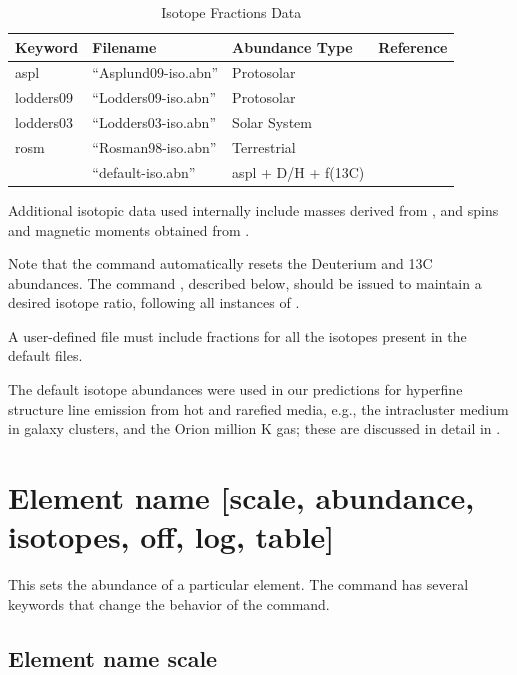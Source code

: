 \begin{table}
\centering
\caption{Isotope Fractions Data}
\label{tab:isotopes}
\begin{tabular}{llll}
\hline
Keyword		& Filename		& Abundance Type	&	Reference		\\
\hline
aspl		& ``Asplund09-iso.abn''	& Protosolar		&	\citet{Asplund2009}	\\
lodders09	& ``Lodders09-iso.abn''	& Protosolar		&	\citet{Lodders2009}	\\
lodders03	& ``Lodders03-iso.abn''	& Solar System		&	\citet{Lodders2003}	\\
rosm		& ``Rosman98-iso.abn''	& Terrestrial 		&	\citet{Rosman1998}	\\
    		& ``default-iso.abn''	& aspl + D/H + f(13C)	&				\\
\hline
\end{tabular}
\end{table}

Additional isotopic data used internally include masses
derived from \citet{Audi1995}, and spins and magnetic
moments obtained from \citet{Stone2005}.

Note that the command automatically resets the Deuterium
and 13C abundances.
The command , described
below, should be issued to maintain a desired isotope ratio,
following all instances of .

A user-defined file must include fractions for all
the isotopes present in the default files.

\par
The default isotope abundances were used in our predictions
for hyperfine structure line emission from hot and rarefied
media, e.g., the intracluster medium in galaxy clusters, and
the Orion million K gas; these are discussed in detail in
\citet{Chatzikos2014}.

\section{Element name [scale, abundance, isotopes, off, log, table]}

This sets the abundance of a particular element.
The command has several
keywords that change the behavior of the command.

\subsection{Element name scale}

